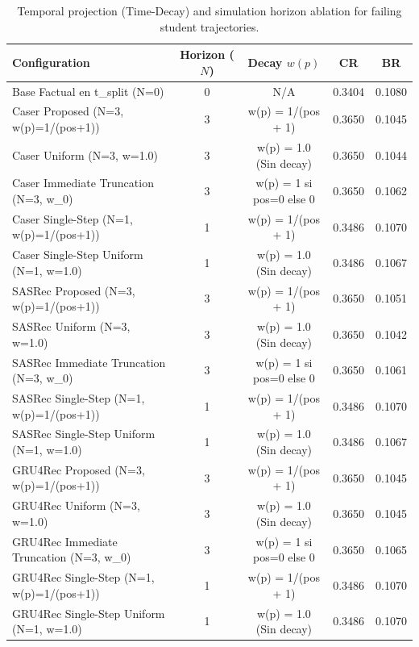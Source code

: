 \begin{table}[ht!]
\centering
\caption{Temporal projection (Time-Decay) and simulation horizon ablation for failing student trajectories.}
\label{tab:ablation_time_decay}
\begin{tabular}{lcccc}
\hline
\textbf{Configuration} & \textbf{Horizon ($N$)} & \textbf{Decay $w(p)$} & \textbf{CR} & \textbf{BR} \\
\hline
Base Factual en t_split (N=0) & 0 & N/A & 0.3404 & 0.1080 \\
Caser Proposed (N=3, w(p)=1/(pos+1)) & 3 & w(p) = 1/(pos + 1) & 0.3650 & 0.1045 \\
Caser Uniform (N=3, w=1.0) & 3 & w(p) = 1.0 (Sin decay) & 0.3650 & 0.1044 \\
Caser Immediate Truncation (N=3, w_0) & 3 & w(p) = 1 si pos=0 else 0 & 0.3650 & 0.1062 \\
Caser Single-Step (N=1, w(p)=1/(pos+1)) & 1 & w(p) = 1/(pos + 1) & 0.3486 & 0.1070 \\
Caser Single-Step Uniform (N=1, w=1.0) & 1 & w(p) = 1.0 (Sin decay) & 0.3486 & 0.1067 \\
SASRec Proposed (N=3, w(p)=1/(pos+1)) & 3 & w(p) = 1/(pos + 1) & 0.3650 & 0.1051 \\
SASRec Uniform (N=3, w=1.0) & 3 & w(p) = 1.0 (Sin decay) & 0.3650 & 0.1042 \\
SASRec Immediate Truncation (N=3, w_0) & 3 & w(p) = 1 si pos=0 else 0 & 0.3650 & 0.1061 \\
SASRec Single-Step (N=1, w(p)=1/(pos+1)) & 1 & w(p) = 1/(pos + 1) & 0.3486 & 0.1070 \\
SASRec Single-Step Uniform (N=1, w=1.0) & 1 & w(p) = 1.0 (Sin decay) & 0.3486 & 0.1067 \\
GRU4Rec Proposed (N=3, w(p)=1/(pos+1)) & 3 & w(p) = 1/(pos + 1) & 0.3650 & 0.1045 \\
GRU4Rec Uniform (N=3, w=1.0) & 3 & w(p) = 1.0 (Sin decay) & 0.3650 & 0.1045 \\
GRU4Rec Immediate Truncation (N=3, w_0) & 3 & w(p) = 1 si pos=0 else 0 & 0.3650 & 0.1065 \\
GRU4Rec Single-Step (N=1, w(p)=1/(pos+1)) & 1 & w(p) = 1/(pos + 1) & 0.3486 & 0.1070 \\
GRU4Rec Single-Step Uniform (N=1, w=1.0) & 1 & w(p) = 1.0 (Sin decay) & 0.3486 & 0.1070 \\
\hline
\end{tabular}
\end{table}
